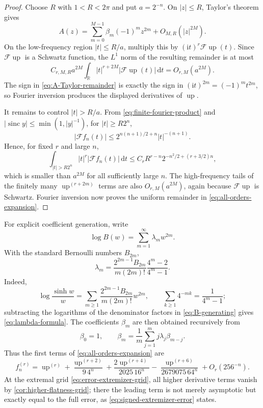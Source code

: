 \documentclass[11pt,oneside]{article}
\theoremstyle{definition}
\theoremstyle{remark}
\newcommand{\R}{\mathbb R}
\newcommand{\Up}{\operatorname{up}}
\newcommand{\sinc}{\operatorname{sinc}}
\newcommand{\dd}{\,\mathrm d}
\newcommand{\iu}{\mathrm i}
\begin{document}
\begin{proof}
Choose $R$ with $1<R<2\pi$ and put $a=2^{-n}$.  On $|z|\le R$, Taylor's theorem gives
\begin{equation}
 A(z)=\sum_{m=0}^{M-1}\beta_m(-1)^m z^{2m}+O_{M,R}(|z|^{2M}).
 \label{eq:A-Taylor-remainder}
\end{equation}
On the low-frequency region $|t|\le R/a$, multiply this by
$(\iu t)^r\mathscr F\Up(t)$.  Since $\mathscr F\Up$ is a Schwartz function, the
$L^1$ norm of the resulting remainder is at most
\[
 C_{r,M,R}a^{2M}\int_{\R}|t|^{r+2M}|\mathscr F\Up(t)|\dd t
 =O_{r,M}(a^{2M}).
\]
The sign in \eqref{eq:A-Taylor-remainder} is exactly the sign in
$(\iu t)^{2m}=(-1)^mt^{2m}$, so Fourier inversion produces the displayed derivatives of
$\Up$.

It remains to control $|t|>R/a$.  From \eqref{eq:finite-fourier-product} and
$|\sinc y|\le\min(1,|y|^{-1})$, for $|t|\ge R2^n$,
\begin{equation}
 |\mathscr F f_n(t)|
 \le 2^{n(n+1)/2+n}|t|^{-(n+1)}.
 \label{eq:finite-product-high-frequency}
\end{equation}
Hence, for fixed $r$ and large $n$,
\[
 \int_{|t|>R2^n}|t|^r|\mathscr F f_n(t)|\dd t
 \le C_r R^{r-n}2^{-n^2/2+(r+3/2)n},
\]
which is smaller than $a^{2M}$ for all sufficiently large $n$.  The high-frequency tails
of the finitely many $\Up^{(r+2m)}$ terms are also $O_{r,M}(a^{2M})$, again because
$\mathscr F\Up$ is Schwartz.  Fourier inversion now proves the uniform remainder in
\eqref{eq:all-orders-expansion}.
\end{proof}

For explicit coefficient generation, write
\begin{equation}
 \log B(w)=\sum_{m=1}^{\infty}\lambda_mw^{2m}.
 \label{eq:lambda-log}
\end{equation}
With the standard Bernoulli numbers $B_{2m}$,
\begin{equation}
 \lambda_m=
 \frac{2^{2m-1}B_{2m}}{m(2m)!}
 \frac{4^m-2}{4^m-1}.
 \label{eq:lambda-formula}
\end{equation}
Indeed,
\[
 \log\frac{\sinh w}{w}
 =\sum_{m\ge1}\frac{2^{2m-1}B_{2m}}{m(2m)!}w^{2m},
 \qquad
 \sum_{k\ge1}4^{-mk}=\frac1{4^m-1};
\]
subtracting the logarithms of the denominator factors in \eqref{eq:B-generating} gives
\eqref{eq:lambda-formula}.  The coefficients $\beta_m$ are then obtained recursively from
\begin{equation}
 \beta_0=1,
 \qquad
 \beta_m=\frac1m\sum_{j=1}^{m}j\lambda_j\beta_{m-j}.
 \label{eq:beta-recurrence}
\end{equation}
Thus the first terms of \eqref{eq:all-orders-expansion} are
\begin{equation}
 f_n^{(r)}=\Up^{(r)}
 +\frac{\Up^{(r+2)}}{9\,4^n}
 +\frac{2\Up^{(r+4)}}{2025\,16^n}
 -\frac{\Up^{(r+6)}}{2679075\,64^n}
 +O_r(256^{-n}).
 \label{eq:first-asymptotic-terms}
\end{equation}
At the extremal grid \eqref{eq:error-extremizer-grid}, all higher derivative terms vanish
by \cref{cor:higher-flatness-grid}; there the leading term is not merely asymptotic but
exactly equal to the full error, as \eqref{eq:signed-extremizer-error} states.
\end{document}
